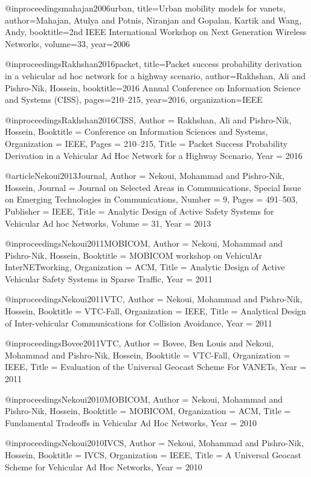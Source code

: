 {{{{{{{{	@inproceedings{mahajan2006urban,
  title={Urban mobility models for vanets},
  author={Mahajan, Atulya and Potnis, Niranjan and Gopalan, Kartik and Wang, Andy},
  booktitle={2nd IEEE International Workshop on Next Generation Wireless Networks},
  volume={33},
  year={2006}
}

@inproceedings{Rakhshan2016packet,
  title={Packet success probability derivation in a vehicular ad hoc network for a highway scenario},
  author={Rakhshan, Ali and Pishro-Nik, Hossein},
  booktitle={2016 Annual Conference on Information Science and Systems (CISS)},
  pages={210--215},
  year={2016},
  organization={IEEE}
}

@inproceedings{Rakhshan2016CISS,
	Author = {Rakhshan, Ali and Pishro-Nik, Hossein},
	Booktitle = {Conference on Information Sciences and Systems},
	Organization = {IEEE},
	Pages = {210--215},
	Title = {Packet Success Probability Derivation in a Vehicular Ad Hoc Network for a Highway Scenario},
	Year = {2016}}

@article{Nekoui2013Journal,
	Author = {Nekoui, Mohammad and Pishro-Nik, Hossein},
	Journal = {Journal on Selected Areas in Communications, Special Issue on Emerging Technologies in Communications},
	Number = {9},
	Pages = {491--503},
	Publisher = {IEEE},
	Title = {Analytic Design of Active Safety Systems for Vehicular Ad hoc Networks},
	Volume = {31},
	Year = {2013}}


@inproceedings{Nekoui2011MOBICOM,
	Author = {Nekoui, Mohammad and Pishro-Nik, Hossein},
	Booktitle = {MOBICOM workshop on VehiculAr InterNETworking},
	Organization = {ACM},
	Title = {Analytic Design of Active Vehicular Safety Systems in Sparse Traffic},
	Year = {2011}}

@inproceedings{Nekoui2011VTC,
	Author = {Nekoui, Mohammad and Pishro-Nik, Hossein},
	Booktitle = {VTC-Fall},
	Organization = {IEEE},
	Title = {Analytical Design of Inter-vehicular Communications for Collision Avoidance},
	Year = {2011}}

@inproceedings{Bovee2011VTC,
	Author = {Bovee, Ben Louis and Nekoui, Mohammad and Pishro-Nik, Hossein},
	Booktitle = {VTC-Fall},
	Organization = {IEEE},
	Title = {Evaluation of the Universal Geocast Scheme For VANETs},
	Year = {2011}}

@inproceedings{Nekoui2010MOBICOM,
	Author = {Nekoui, Mohammad and Pishro-Nik, Hossein},
	Booktitle = {MOBICOM},
	Organization = {ACM},
	Title = {Fundamental Tradeoffs in Vehicular Ad Hoc Networks},
	Year = {2010}}

@inproceedings{Nekoui2010IVCS,
	Author = {Nekoui, Mohammad and Pishro-Nik, Hossein},
	Booktitle = {IVCS},
	Organization = {IEEE},
	Title = {A Universal Geocast Scheme for Vehicular Ad Hoc Networks},
	Year = {2010}}

}}}}}}}}
